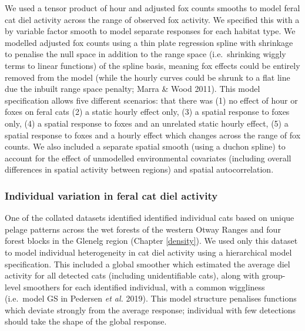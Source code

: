 \documentclass[11pt,a4paper,titlepage,twoside,openright]{style/unimelbthesis}
\begin{document}
\begin{mainmatter}
We used a tensor product of hour and adjusted fox counts smooths to model feral cat diel activity across the range of observed fox activity. We specified this with a by variable factor smooth to model separate responses for each habitat type. We modelled adjusted fox counts using a thin plate regression spline with shrinkage to penalise the null space in addition to the range space (i.e.~shrinking wiggly terms to linear functions) of the spline basis, meaning fox effects could be entirely removed from the model (while the hourly curves could be shrunk to a flat line due the inbuilt range space penalty; Marra \& Wood 2011). This model specification allows five different scenarios: that there was (1) no effect of hour or foxes on feral cats (2) a static hourly effect only, (3) a spatial response to foxes only, (4) a spatial response to foxes and an unrelated static hourly effect, (5) a spatial response to foxes and a hourly effect which changes across the range of fox counts. We also included a separate spatial smooth (using a duchon spline) to account for the effect of unmodelled environmental covariates (including overall differences in spatial activity between regions) and spatial autocorrelation.

\hypertarget{individual-variation-in-feral-cat-diel-activity}{%
\subsubsection{Individual variation in feral cat diel activity}\label{individual-variation-in-feral-cat-diel-activity}}

One of the collated datasets identified identified individual cats based on unique pelage patterns across the wet forests of the western Otway Ranges and four forest blocks in the Glenelg region (Chapter \ref{density}). We used only this dataset to model individual heterogeneity in cat diel activity using a hierarchical model specification. This included a global smoother which estimated the average diel activity for all detected cats (including unidentifiable cats), along with group-level smoothers for each identified individual, with a common wiggliness (i.e.~model GS in Pedersen \emph{et al.} 2019). This model structure penalises functions which deviate strongly from the average response; individual with few detections should take the shape of the global response.

\newpage
\begin{figure}


\end{figure}
\end{mainmatter}
\end{document}
